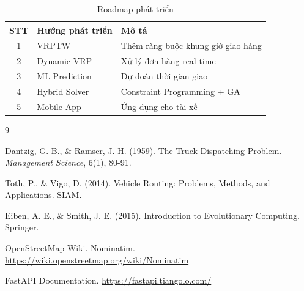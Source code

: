 \documentclass[12pt,a4paper,openany,oneside]{report}
\begin{document}
\begin{table}[h]
\centering
\caption{Roadmap phát triển}
\begin{tabular}{@{}cll@{}}
\toprule
\textbf{STT} & \textbf{Hướng phát triển} & \textbf{Mô tả} \\
\midrule
1 & VRPTW & Thêm ràng buộc khung giờ giao hàng \\
2 & Dynamic VRP & Xử lý đơn hàng real-time \\
3 & ML Prediction & Dự đoán thời gian giao \\
4 & Hybrid Solver & Constraint Programming + GA \\
5 & Mobile App & Ứng dụng cho tài xế \\
\bottomrule
\end{tabular}
\end{table}

\newpage
\begin{thebibliography}{9}

Dantzig, G. B., \& Ramser, J. H. (1959). 
The Truck Dispatching Problem. 
\textit{Management Science}, 6(1), 80-91.

Toth, P., \& Vigo, D. (2014). 
Vehicle Routing: Problems, Methods, and Applications. 
SIAM.

Eiben, A. E., \& Smith, J. E. (2015). 
Introduction to Evolutionary Computing. 
Springer.

OpenStreetMap Wiki. Nominatim.
\url{https://wiki.openstreetmap.org/wiki/Nominatim}

FastAPI Documentation.
\url{https://fastapi.tiangolo.com/}

\end{thebibliography}
\end{document}

